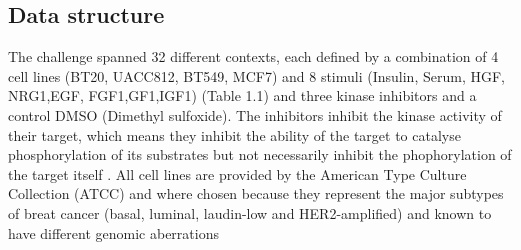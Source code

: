 \subsection{Data structure}

The challenge spanned 32 different contexts, each defined by a combination of 4 cell lines (BT20, UACC812, BT549, MCF7) and 8 stimuli (Insulin, Serum, HGF, NRG1,EGF, FGF1,GF1,IGF1) (Table 1.1) and three kinase inhibitors and a control DMSO (Dimethyl sulfoxide). The inhibitors inhibit the kinase activity of their target, which means they inhibit the ability of the target to catalyse phosphorylation of its substrates but not necessarily inhibit the phophorylation of the target itself \citep{Hill.2016}. All cell lines are provided by the American Type Culture Collection (ATCC) and where chosen because they represent the major subtypes of breat cancer (basal, luminal, laudin-low and HER2-amplified) and known to have different genomic aberrations \citep{Neve.2006} \citep{Garnett.2012}\citep{Barretina.2012}
